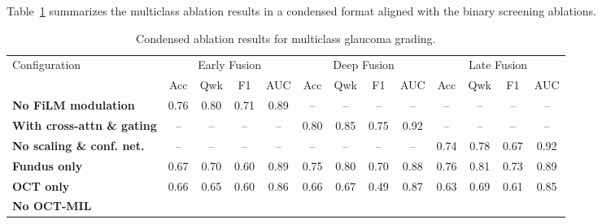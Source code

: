 \documentclass[preprint,12pt]{elsarticle}
\begin{document}
Table~\ref{tab:multiclass-ablation-condensed} summarizes the multiclass ablation results in a condensed format aligned with the binary screening ablations.

\begin{table}[!t]
    \centering
    \caption{Condensed ablation results for multiclass glaucoma grading.}
    \label{tab:multiclass-ablation-condensed}
    \scriptsize
    \setlength{\tabcolsep}{3pt}
    \begin{tabular}{|l|cccc|cccc|cccc|}
        \hline
        \multirow{2}{*}{Configuration}     &
        \multicolumn{4}{c|}{Early Fusion}  &
        \multicolumn{4}{c|}{Deep Fusion}   &
        \multicolumn{4}{c|}{Late Fusion}                                \\
        \cline{2-13}
                                           & Acc  & Qwk  & F1   & AUC &
        Acc                                & Qwk  & F1   & AUC  &
        Acc                                & Qwk  & F1   & AUC          \\
        \hline
        \textbf{No FiLM modulation}        &
        0.76                               & 0.80 & 0.71 & 0.89 &
        --                                 & --   & --   & --   &
        --                                 & --   & --   & --           \\
        \textbf{With cross-attn \& gating} &
        --                                 & --   & --   & --   &
        0.80                               & 0.85 & 0.75 & 0.92 &
        --                                 & --   & --   & --           \\
        \textbf{No scaling \& conf. net.}  &
        --                                 & --   & --   & --   &
        --                                 & --   & --   & --   &
        0.74                               & 0.78 & 0.67 & 0.92         \\
        \hline
        \textbf{Fundus only}               &
        0.67                               & 0.70 & 0.60 & 0.89 &
        0.75                               & 0.80 & 0.70 & 0.88 &
        0.76                               & 0.81 & 0.73 & 0.89         \\
        \textbf{OCT only}                  &
        0.66                               & 0.65 & 0.60 & 0.86 &
        0.66                               & 0.67 & 0.49 & 0.87 &
        0.63                               & 0.69 & 0.61 & 0.85         \\
        \hline
        \textbf{No OCT-MIL}                &

\end{tabular}
\end{table}
\end{document}
